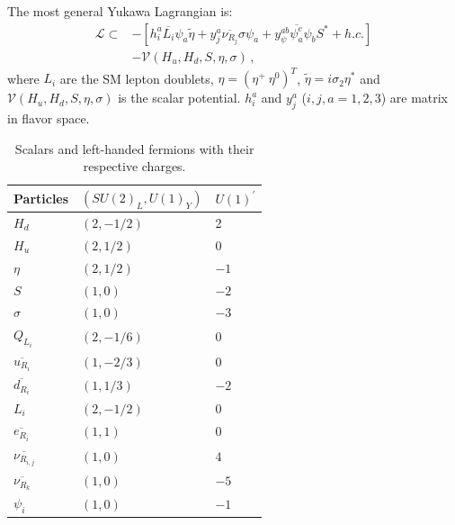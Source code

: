\documentclass[12pt]{article}
\begin{document}
The most general Yukawa Lagrangian is:
%
\begin{align*}
\label{Eq:LagY}
    \mathcal{L} \subset& -[ 
    h^{a}_{i} \overline{L_{i}} \psi_{a} \widetilde{\eta}  +  y^{a}_{j} \overline{\nu_{R_{j}}} \sigma \psi_{a} + y_{\psi}^{a b} \overline{\psi^{c}_{a}} \psi_{b} S^{*} + h.c.] \\
    &- \mathcal{V}(H_{u}, H_{d}, S, \eta, \sigma)\,,
\end{align*}
%
where $L_{i}$ are the SM lepton doublets, $\eta = \left( \eta^{+} \ \eta^{0} \right)^{T}$, $\widetilde{\eta} = i \sigma_2 \eta^{*}$ and $\mathcal{V}(H_{u}, H_{d}, S, \eta, \sigma)$ is the scalar potential. $h^{a}_i$ and $y^{a}_{j}$ ($i,j,a=1,2,3$) are matrix in flavor space.
%
\begin{table}
  \centering
  \begin{tabular}{|l|l|l|}
    \hline  
    Particles     & $\left( SU(2)_L, U(1)_Y \right)$ & $U(1)^{\prime}$ \\ \hline
    $H_{d} $  & $(2,-1/2)$ &  2 \\
    $H_{u} $  & $(2, 1/2)$ &  0 \\
    $\eta$ & $(2,1/2)$ & $-1$ \\
    $S$ & $(1,0)$ & $-2$ \\
    $\sigma$ & $(1,0)$ & $-3$ \\
    \hline
    $Q_{L_{i}}$  & $(2,-1/6)$ & $0$ \\
    $\overline{u_{R_{i}}}$ & $(1,-2/3)$ & $0$ \\
    $\overline{d_{R_{i}}}$ & $(1,1/3)$ & $-2$ \\
    \hline
    $L_i$  & $(2,-1/2)$ & $0$ \\
    $\overline{e_{R_i}}$ & $(1,1)$ & $0$ \\
    $\overline{\nu_{R_{i,j}}}$ & $(1,0)$ & $4$\\
    $\overline{\nu_{R_k}}$ & $(1,0)$ & $-5$\\
    $\psi_{i}$  & $(1,0)$ & $-1$ \\\hline
  \end{tabular}
  \caption{Scalars and left-handed fermions with their respective charges.}
  \label{tab:partcont}
\end{table}
%
\end{document}
